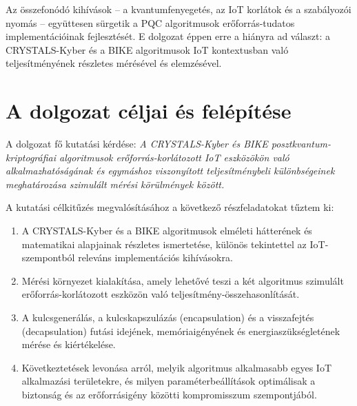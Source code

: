 Az összefonódó kihívások -- a kvantumfenyegetés, az IoT korlátok és a szabályozói nyomás --
együttesen sürgetik a PQC algoritmusok erőforrás-tudatos implementációinak fejlesztését. E dolgozat
éppen erre a hiányra ad választ: a CRYSTALS-Kyber és a BIKE algoritmusok IoT kontextusban való
teljesítményének részletes mérésével és elemzésével.


\section{A dolgozat céljai és felépítése}

A dolgozat fő kutatási kérdése: \textit{A CRYSTALS-Kyber és BIKE posztkvantum-kriptográfiai
algoritmusok erőforrás-korlátozott IoT eszközökön való alkalmazhatóságának és egymáshoz
viszonyított teljesítménybeli különbségeinek meghatározása szimulált mérési körülmények között.}

A kutatási célkitűzés megvalósításához a következő részfeladatokat tűztem ki:
\begin{enumerate}
    \item A CRYSTALS-Kyber és a BIKE algoritmusok elméleti hátterének és matematikai
          alapjainak részletes ismertetése, különös tekintettel az IoT-szempontból
          releváns implementációs kihívásokra.
    \item Mérési környezet kialakítása, amely lehetővé teszi a két algoritmus
          szimulált erőforrás-korlátozott eszközön való teljesítmény-összehasonlítását.
    \item A kulcsgenerálás, a kulcskapszulázás (encapsulation) és a visszafejtés
          (decapsulation) futási idejének, memóriaigényének és energiaszükségletének
          mérése és kiértékelése.
    \item Következtetések levonása arról, melyik algoritmus alkalmasabb egyes IoT
          alkalmazási területekre, és milyen paraméterbeállítások optimálisak a
          biztonság és az erőforrásigény közötti kompromisszum szempontjából.
\end{enumerate}

